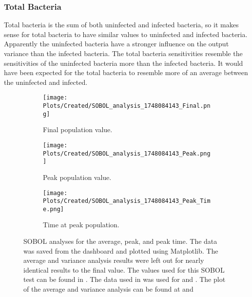 \subsubsection{Total Bacteria}
Total bacteria is the sum of both uninfected and infected bacteria, so it makes sense for total bacteria to have similar values to uninfected and infected bacteria. 
Apparently the uninfected bacteria have a stronger influence on the output variance than the infected bacteria. 
The total bacteria sensitivities resemble the sensitivities of the uninfected bacteria more than the infected bacteria. 
It would have been expected for the total bacteria to resemble more of an average between the uninfected and infected. 

\begin{figure}[h!]
    \centering
    \begin{subfigure}{0.32\linewidth}
        \centering
        \captionsetup{width=1\linewidth}
        \texttt{[image: Plots/Created/SOBOL\_analysis\_1748084143\_Final.png]}
        \caption{
            Final population value. 
        }
        \label{fig:created:SOBOL_final}
    \end{subfigure}
    \hfill
    \begin{subfigure}{0.32\linewidth}
        \centering
        \captionsetup{width=1\linewidth}
        \texttt{[image: Plots/Created/SOBOL\_analysis\_1748084143\_Peak.png]}
        \caption{
            Peak population value. 
        }
        \label{fig:created:SOBOL_peak}
    \end{subfigure}
    \hfill
    \begin{subfigure}{0.32\linewidth}
        \centering
        \captionsetup{width=1\linewidth}
        \texttt{[image: Plots/Created/SOBOL\_analysis\_1748084143\_Peak\_Time.png]}
        \caption{
            Time at peak population. 
        }
        \label{fig:created:SOBOL_peak_time}
    \end{subfigure}
    \caption{
        SOBOL analyses for the average, peak, and peak time. 
        The data was saved from the dashboard and plotted using Matplotlib. 
        The average and variance analysis results were left out for nearly identical results to the final value. 
        The values used for this SOBOL test can be found in . 
        The data used in  was used for  and . 
        The plot of the average and variance analysis can be found at  and 
    }
    \label{fig:created:SOBOL_analyses}
\end{figure}

